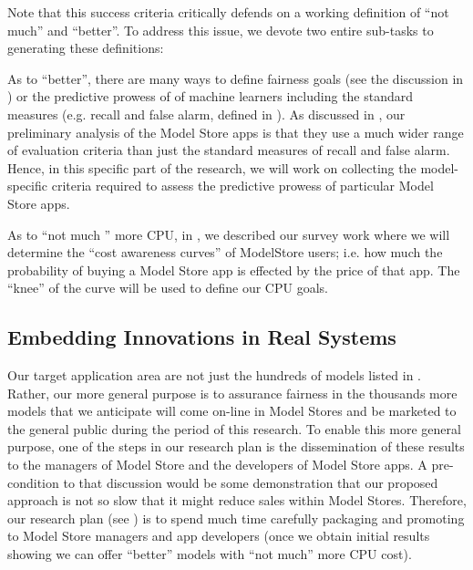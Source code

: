  Note that this success criteria
 critically defends on  a working definition of ``not much'' and ``better''.
 To address this issue, we devote two entire sub-tasks to
 generating these definitions:
\bi
 \item
 As to ``better'', there are many ways to define fairness
 goals (see the discussion in )
 or the predictive prowess of  
  of machine learners including the standard measures (e.g.
  recall and false alarm, defined in ).
  As  discussed in , our
  preliminary analysis of the Model Store apps is that
  they use a much wider range of evaluation criteria
  than just the standard measures of recall and false alarm. Hence, in this specific part of the research, we will work on collecting the model-specific criteria required to assess the predictive prowess of particular
  Model Store apps.
 \item
 As to ``not much '' more CPU,
 in , we described our survey   work
 where we will determine the
 ``cost awareness curves'' of ModelStore users; i.e. how much the probability of buying a Model Store app is effected by the price of that app. The ``knee'' of the curve will be used to define our CPU goals.

\ei

\subsection{Embedding Innovations in Real Systems}\label{embedding}

Our target application area are not just
the hundreds of models listed in . Rather,
our more general purpose is to assurance fairness in the thousands more
models that we anticipate   will come on-line in Model
Stores and be marketed to the general public during the period of this research.  
To enable this more general purpose,  one of  the steps in our research plan is the dissemination of these results to the managers
of Model Store and the developers of Model Store apps.
A pre-condition to that discussion would be some demonstration
that our proposed approach is not so slow that it might reduce  sales within Model Stores.
Therefore, our research plan (see ) is 
to spend much time
carefully packaging and promoting {\IT}
to
Model Store managers and app developers
(once we obtain
  initial results showing 
 we can offer ``better'' models with ``not much'' more CPU cost).

